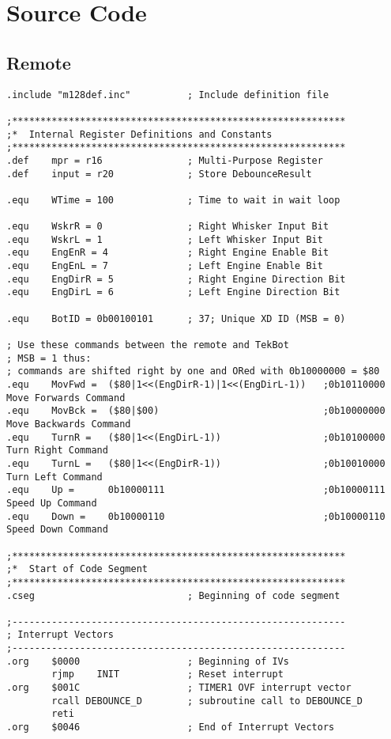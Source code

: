 \documentclass[12pt,letterpaper]{article}
\begin{document}
\section{Source Code}

\subsection{Remote}

\begin{verbatim}
.include "m128def.inc"          ; Include definition file

;***********************************************************
;*  Internal Register Definitions and Constants
;***********************************************************
.def    mpr = r16               ; Multi-Purpose Register
.def    input = r20             ; Store DebounceResult

.equ    WTime = 100             ; Time to wait in wait loop

.equ    WskrR = 0               ; Right Whisker Input Bit
.equ    WskrL = 1               ; Left Whisker Input Bit
.equ    EngEnR = 4              ; Right Engine Enable Bit
.equ    EngEnL = 7              ; Left Engine Enable Bit
.equ    EngDirR = 5             ; Right Engine Direction Bit
.equ    EngDirL = 6             ; Left Engine Direction Bit

.equ    BotID = 0b00100101      ; 37; Unique XD ID (MSB = 0)

; Use these commands between the remote and TekBot
; MSB = 1 thus:
; commands are shifted right by one and ORed with 0b10000000 = $80
.equ    MovFwd =  ($80|1<<(EngDirR-1)|1<<(EngDirL-1))   ;0b10110000 Move Forwards Command
.equ    MovBck =  ($80|$00)                             ;0b10000000 Move Backwards Command
.equ    TurnR =   ($80|1<<(EngDirL-1))                  ;0b10100000 Turn Right Command
.equ    TurnL =   ($80|1<<(EngDirR-1))                  ;0b10010000 Turn Left Command
.equ    Up =      0b10000111                            ;0b10000111 Speed Up Command
.equ    Down =    0b10000110                            ;0b10000110 Speed Down Command

;***********************************************************
;*  Start of Code Segment
;***********************************************************
.cseg                           ; Beginning of code segment

;-----------------------------------------------------------
; Interrupt Vectors
;-----------------------------------------------------------
.org    $0000                   ; Beginning of IVs
        rjmp    INIT            ; Reset interrupt
.org    $001C                   ; TIMER1 OVF interrupt vector
        rcall DEBOUNCE_D        ; subroutine call to DEBOUNCE_D
        reti
.org    $0046                   ; End of Interrupt Vectors


\end{verbatim}
\end{document}
